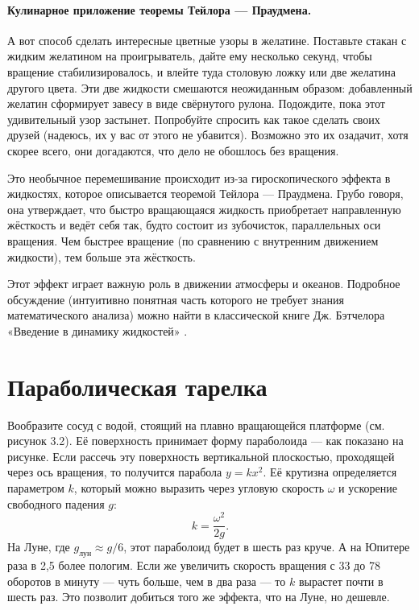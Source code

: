 \paragraph{Кулинарное приложение теоремы Тейлора --- Праудмена.} %
А вот способ сделать интересные цветные узоры в желатине.
Поставьте стакан с жидким желатином на проигрыватель, дайте ему несколько секунд, чтобы вращение стабилизировалось, и влейте туда столовую ложку или две желатина другого цвета.
Эти две жидкости смешаются неожиданным образом: добавленный желатин сформирует завесу в виде свёрнутого рулона.
Подождите, пока этот удивительный узор застынет.
Попробуйте спросить как такое сделать своих друзей (надеюсь, их у вас от этого не убавится).
Возможно это их озадачит, хотя скорее всего, они догадаются, что дело не обошлось без вращения.

Это необычное перемешивание происходит из-за гироскопического эффекта в жидкостях, которое описывается теоремой Тейлора --- Праудмена.
Грубо говоря, она утверждает, что быстро вращающаяся жидкость приобретает направленную жёсткость и ведёт себя так, будто состоит из зубочисток, параллельных оси вращения.
Чем быстрее вращение (по сравнению с внутренним движением жидкости), тем больше эта жёсткость.

Этот эффект играет важную роль в движении атмосферы и океанов.
Подробное обсуждение (интуитивно понятная часть которого не требует знания математического анализа) можно найти в классической книге Дж. Бэтчелора «Введение в динамику жидкостей» \cite{batchelor1967}.

\section{Параболическая тарелка}

Вообразите сосуд с водой, стоящий на плавно вращающейся платформе (см. рисунок 3.2).
Её поверхность принимает форму параболоида --- как показано на рисунке.
Если рассечь эту поверхность вертикальной плоскостью, проходящей через ось вращения, то получится парабола $y=kx^2$.
Её крутизна определяется параметром $k$, который можно выразить через угловую скорость $\omega$ и ускорение свободного падения $g$:
\begin{equation}
k=\frac{\omega^2}{2g}.
\label{eq:3.1}
\end{equation}
На Луне, где $g_{\text{лун}} \approx g/6$, этот параболоид будет в шесть раз круче.
А на Юпитере раза в 2{,}5 более пологим.
Если же увеличить скорость вращения с 33 до 78 оборотов в минуту --- чуть больше, чем в два раза --- то $k$ вырастет почти в шесть раз.
Это позволит добиться того же эффекта, что на Луне, но дешевле.

